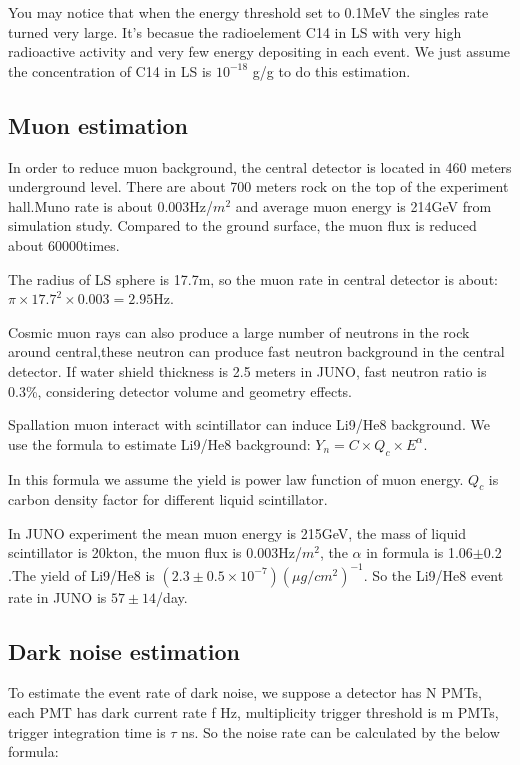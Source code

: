 \documentclass[a4paper,10pt,twoside]{paper}
\begin{document}
	\begin{multicols}{2}

		You may notice that when the energy threshold set to 0.1MeV the singles rate turned very
		large. It's becasue the radioelement C14 in LS with very high radioactive activity and very
		few energy depositing in each event. We just assume the concentration of C14 in LS is $10^{-18}$ g/g
		to do this estimation.

		\subsection{Muon estimation}
		In order to reduce muon background, the central detector is 
		located in 460 meters underground level. There are about 700
		meters rock on the top of the experiment hall.Muno rate is about
		0.003Hz/$m^2$ and average muon energy is 214GeV from simulation
		study\cite{lab11}. Compared to the ground surface, the muon flux
		is reduced about 60000times.

		The radius of LS sphere is 17.7m, so the muon rate in central
		detector is about: $\pi \times 17.7^2 \times 0.003 = 2.95$Hz.

		Cosmic muon rays can also produce a large number of neutrons
		in the rock around central,these neutron can produce fast 
		neutron background in the central detector. If water shield
		thickness is 2.5 meters in JUNO, fast neutron ratio is 0.3\%,
		considering detector volume and geometry effects.

		Spallation muon interact with scintillator can induce Li9/He8
		background. We use the  formula to estimate Li9/He8 
		background: $Y_n = C \times Q_c \times E^\alpha$.

		In this formula we assume the yield is power law function of 
		muon energy. $Q_c$ is carbon density factor for different
		liquid scintillator.

		In JUNO experiment the mean muon energy is 215GeV, the mass of
		liquid scintillator is 20kton, the muon flux is 0.003Hz/$m^2$, 
		the $\alpha$ in formula is 1.06$\pm$0.2 .The yield of 
		Li9/He8 is $(2.3\pm0.5\times10^{-7})(\mu g /cm^2)^{-1}$.
		So the Li9/He8 event rate in JUNO is $57\pm14$/day.




		\subsection{Dark noise estimation}

		To estimate the event rate of dark noise, we suppose a detector
		has N PMTs, each PMT has dark current rate f Hz, multiplicity 
		trigger threshold is m PMTs, trigger integration time is $\tau$
		ns. So the noise rate can be calculated by the below formula:


\end{multicols}
\end{document}
